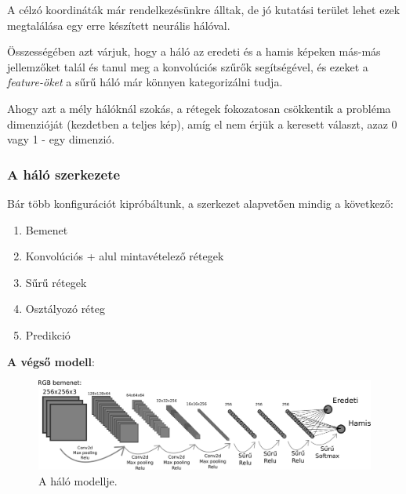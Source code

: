 A célzó koordináták már rendelkezésünkre álltak, de jó kutatási terület lehet ezek 
megtalálása egy erre készített neurális hálóval.


Összességében azt várjuk, hogy a háló az eredeti és a hamis képeken más-más 
jellemzőket talál és tanul meg a konvolúciós szűrők segítségével, és ezeket
a \textit{feature-öket} a sűrű háló már könnyen kategorizálni tudja.

Ahogy azt a mély hálóknál szokás, a rétegek fokozatosan csökkentik a probléma
dimenzióját (kezdetben a teljes kép), amíg el nem érjük a keresett választ, azaz 0 vagy 1 - 
egy dimenzió.

\subsubsection{A háló szerkezete}

Bár több konfigurációt kipróbáltunk, a szerkezet alapvetően mindig a következő:



\begin{enumerate} [itemsep=-1ex]
	\item Bemenet
	\item Konvolúciós + alul mintavételező rétegek
	\item Sűrű rétegek
	\item Osztályozó réteg
	\item Predikció
\end{enumerate}

\textbf{A végső modell}:
\begin{figure} [h!]
	\label{fig:predictor-halo-modell}
	\centering
	\includegraphics[scale=0.3]{img/predictor-network-modell.pdf}
	\caption{A háló modellje.}
\end{figure}

